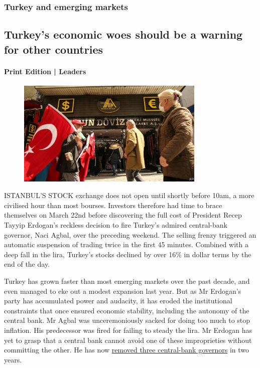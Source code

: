 \documentclass{article}
\begin{document}
\subsubsection{Turkey and emerging markets }
\subsection{Turkey's economic woes should be a warning for other countries }
\paragraph{Print Edition | Leaders  \quad \color{gray}{Mar 25th 2021 }}
\begin{figure}[h]
\centering
\includegraphics[width=0.8\textwidth]{images/20210327_ldp501.jpg}
\end{figure}
\lettrine{I}STANBUL'S STOCK exchange does not open until shortly before 10am, a more civilised hour than most bourses. Investors therefore had time to brace themselves on March 22nd before discovering the full cost of President Recep Tayyip Erdogan's reckless decision to fire Turkey's admired central-bank governor, Naci Agbal, over the preceding weekend. The selling frenzy triggered an automatic suspension of trading twice in the first 45 minutes. Combined with a deep fall in the lira, Turkey's stocks declined by over 16\% in dollar terms by the end of the day. 

Turkey has grown faster than most emerging markets over the past decade, and even managed to eke out a modest expansion last year. But as Mr Erdogan's party has accumulated power and audacity, it has eroded the institutional constraints that once ensured economic stability, including the autonomy of the central bank. Mr Agbal was unceremoniously sacked for doing too much to stop inflation. His predecessor was fired for failing to steady the lira. Mr Erdogan has yet to grasp that a central bank cannot avoid one of these improprieties without committing the other. He has now \href{/europe/2021/03/25/a-debacle-at-turkeys-central-bank}{removed three central-bank governors} in two years. 
\end{document}
